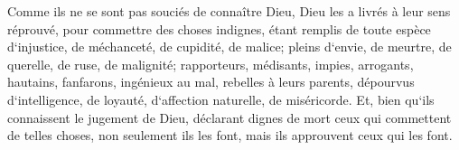 \verse Comme ils ne se sont pas souciés de connaître Dieu, Dieu les a livrés à leur sens réprouvé, pour commettre des choses indignes, 
\verse étant remplis de toute espèce d`injustice, de méchanceté, de cupidité, de malice; pleins d`envie, de meurtre, de querelle, de ruse, de malignité; 
\verse rapporteurs, médisants, impies, arrogants, hautains, fanfarons, ingénieux au mal, rebelles à leurs parents, dépourvus d`intelligence, 
\verse de loyauté, d`affection naturelle, de miséricorde. 
\verse Et, bien qu`ils connaissent le jugement de Dieu, déclarant dignes de mort ceux qui commettent de telles choses, non seulement ils les font, mais ils approuvent ceux qui les font. 

